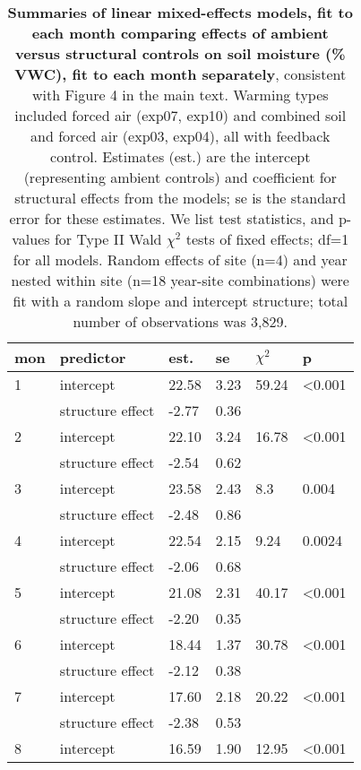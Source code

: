 \documentclass{article}
\begin{document}
\begin{table}[ht]
\centering
\caption{\textbf{Summaries of linear mixed-effects models, fit to each month comparing effects of ambient versus structural controls on soil moisture (\% VWC), fit to each month separately}, consistent with Figure 4 in the main text. Warming types included forced air (exp07, exp10) and combined soil and forced air (exp03, exp04), all with feedback control. Estimates (est.) are the intercept (representing ambient controls) and coefficient for structural effects from the models; se is the standard error for these estimates. We list test statistics, and p-values for Type II Wald $\chi^{2}$ tests of fixed effects; df=1 for all models. Random effects of site (n=4) and year nested within site (n=18 year-site combinations) were fit with a random slope and intercept structure; total number of observations was 3,829.} 
\label{table:shamamb_soilmoism}
\begingroup\footnotesize
\begin{tabular}{|p{}|p{}p{}p{}p{}p{}|}
  \hline
mon & predictor & est. & se & $\chi^2$ & p \\ 
  \hline
  1 & intercept & 22.58 & 3.23 & 59.24 & <0.001 \\ 
   & structure effect & -2.77 & 0.36 &  &  \\ 
   \hline
  2 & intercept & 22.10 & 3.24 & 16.78 & <0.001 \\ 
   & structure effect & -2.54 & 0.62 &  &  \\ 
   \hline
  3 & intercept & 23.58 & 2.43 & 8.3 & 0.004 \\ 
   & structure effect & -2.48 & 0.86 &  &  \\ 
   \hline
  4 & intercept & 22.54 & 2.15 & 9.24 & 0.0024 \\ 
   & structure effect & -2.06 & 0.68 &  &  \\ 
   \hline
  5 & intercept & 21.08 & 2.31 & 40.17 & <0.001 \\ 
   & structure effect & -2.20 & 0.35 &  &  \\ 
   \hline
  6 & intercept & 18.44 & 1.37 & 30.78 & <0.001 \\ 
   & structure effect & -2.12 & 0.38 &  &  \\ 
   \hline
  7 & intercept & 17.60 & 2.18 & 20.22 & <0.001 \\ 
   & structure effect & -2.38 & 0.53 &  &  \\ 
   \hline
  8 & intercept & 16.59 & 1.90 & 12.95 & <0.001 \\ 

\end{tabular}
\end{table}
\end{document}
